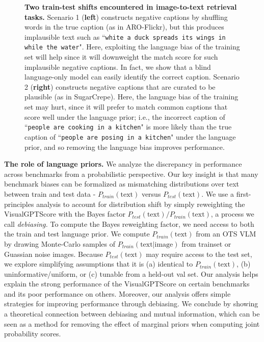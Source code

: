 \documentclass{article} \usepackage{iclr2024_conference,times}
\begin{document}
\begin{figure}[t]
\centering
    \caption{\small {\bf Two train-test shifts encountered in image-to-text retrieval tasks.} Scenario 1 ({\bf left}) constructs negative captions by shuffling words in the true caption (as in ARO-Flickr), but this produces implausible text such as ``{\tt white a duck spreads its wings in while the water}". Here, exploiting the language bias of the training set will help since it will downweight the match score for such implausible negative captions. In fact, we show that a blind language-only model can easily identify the correct caption.  Scenario 2 ({\bf right}) constructs negative captions that are curated to be plausible (as in SugarCrepe). Here, the language bias of the training set may hurt, since it will prefer to match common captions that score well under the language prior; i.e., the incorrect caption of ``{\tt people are cooking in a kitchen}" is more likely than the true caption of ``{\tt people are posing in a kitchen}" under the language prior, and so removing the language bias improves performance.} 
\label{fig:prior_difference}
\end{figure}

{\bf The role of language priors.} We analyze the discrepancy in performance across benchmarks from a probabilistic perspective. Our key insight is that many benchmark biases can be formalized as mismatching distributions over text between train and test data - $P_{train}(\text{text})$ versus $P_{test}(\text{text})$. We use a first-principles analysis to account for distribution shift by simply reweighting the VisualGPTScore with the Bayes factor $P_{test}(\text{text})/P_{train}(\text{text})$, a process we call {\em debiasing.} To compute the Bayes reweighting factor, we need access to both the train and test language prior. We compute $P_{train}(\text{text})$ from an OTS VLM by drawing Monte-Carlo samples of $P_{train}(\text{text}|\text{image})$ from trainset or Guassian noise images. Because $P_{test}(\text{text})$ may require access to the test set, we explore simplifying assumptions that it is (a) identical to $P_{train}(\text{text})$, (b) uninformative/uniform, or (c) tunable from a held-out val set. Our analysis helps explain the strong performance of the VisualGPTScore on certain benchmarks and its poor performance on others. Moreover, our analysis offers simple strategies for improving performance through debiasing. We conclude by showing a theoretical connection between debiasing and mutual information, which can be seen as a method for removing the effect of marginal priors when computing joint probability scores.
\end{document}
